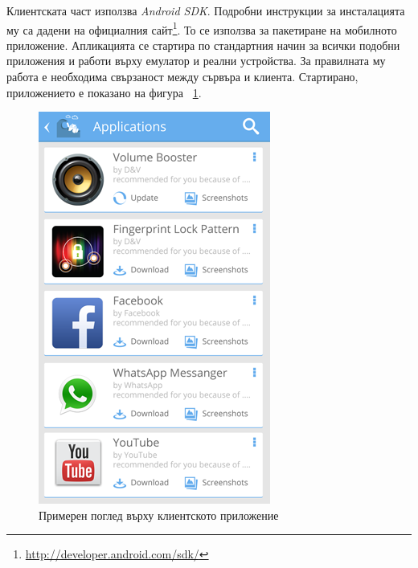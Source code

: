 	Клиентската част използва \emph{Android SDK}. Подробни инструкции за инсталацията му са дадени на официалния сайт\footnote{\url{http://developer.android.com/sdk/}}. То се използва за пакетиране на мобилното приложение. Апликацията се стартира по стандартния начин за всички подобни приложения и работи върху емулатор и реални устройства. За правилната му работа е необходима свързаност между сървъра и клиента. Стартирано, приложението е показано на фигура ~\ref{figure:client-recommendations}.

	\begin{figure}[htbp]
		\centering
 		\includegraphics{assets/tsunapper-app-recommendations.png}
		\caption{Примерен поглед върху клиентското приложение}
		\label{figure:client-recommendations}
	\end{figure}
